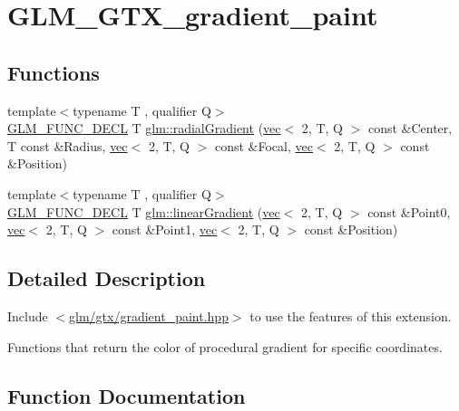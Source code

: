 \hypertarget{group__gtx__gradient__paint}{}\section{G\+L\+M\+\_\+\+G\+T\+X\+\_\+gradient\+\_\+paint}
\label{group__gtx__gradient__paint}
\subsection*{Functions}
\begin{DoxyCompactItemize}
\item 
{\footnotesize template$<$typename T , qualifier Q$>$ }\\\hyperlink{setup_8hpp_ab2d052de21a70539923e9bcbf6e83a51}{G\+L\+M\+\_\+\+F\+U\+N\+C\+\_\+\+D\+E\+CL} T \hyperlink{group__gtx__gradient__paint_gaaecb1e93de4cbe0758b882812d4da294}{glm\+::radial\+Gradient} (\hyperlink{structglm_1_1vec}{vec}$<$ 2, T, Q $>$ const \&Center, T const \&Radius, \hyperlink{structglm_1_1vec}{vec}$<$ 2, T, Q $>$ const \&Focal, \hyperlink{structglm_1_1vec}{vec}$<$ 2, T, Q $>$ const \&Position)
\item 
{\footnotesize template$<$typename T , qualifier Q$>$ }\\\hyperlink{setup_8hpp_ab2d052de21a70539923e9bcbf6e83a51}{G\+L\+M\+\_\+\+F\+U\+N\+C\+\_\+\+D\+E\+CL} T \hyperlink{group__gtx__gradient__paint_ga849241df1e55129b8ce9476200307419}{glm\+::linear\+Gradient} (\hyperlink{structglm_1_1vec}{vec}$<$ 2, T, Q $>$ const \&Point0, \hyperlink{structglm_1_1vec}{vec}$<$ 2, T, Q $>$ const \&Point1, \hyperlink{structglm_1_1vec}{vec}$<$ 2, T, Q $>$ const \&Position)
\end{DoxyCompactItemize}


\subsection{Detailed Description}
Include $<$\hyperlink{gradient__paint_8hpp}{glm/gtx/gradient\+\_\+paint.\+hpp}$>$ to use the features of this extension.

Functions that return the color of procedural gradient for specific coordinates. 

\subsection{Function Documentation}
\mbox{\label{group__gtx__gradient__paint_ga849241df1e55129b8ce9476200307419}} 

